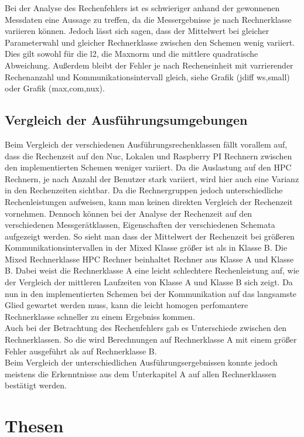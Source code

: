 Bei der Analyse des Rechenfehlers ist es schwieriger anhand der gewonnenen Messdaten eine Aussage zu treffen, da die Messergebnisse je nach Rechnerklasse variieren k\"onnen.  Jedoch l\"asst sich sagen, dass der Mittelwert bei gleicher Parameterwahl und gleicher Rechnerklasse zwischen den Schemen wenig variiert. Dies gilt sowohl f\"ur die l2, die Maxnorm und die mittlere quadratische Abweichung. Au\ss{}erdem bleibt der Fehler je nach Recheneinheit mit varrierender Rechenanzahl und Kommunikationsintervall gleich, siehe Grafik (jdiff ws,small) oder Grafik (max,com,nux).\\

\subsection{Vergleich der Ausf\"uhrungsumgebungen}
Beim Vergleich der verschiedenen Ausf\"uhrungsrechenklassen f\"allt vorallem auf, dass die Rechenzeit auf den Nuc, Lokalen und Raspberry PI Rechnern zwischen den implementierten Schemen weniger variiert. Da die Auslastung auf den HPC Rechnern, je nach Anzahl der Benutzer stark variiert, wird hier auch eine Varianz in den Rechenzeiten sichtbar. Da die Rechnergruppen jedoch unterschiedliche Rechenleistungen aufweisen, kann man keinen direkten Vergleich der Rechenzeit vornehmen. Dennoch k\"onnen bei der Analyse der Rechenzeit auf den verschiedenen Messger\"atklassen, Eigenschaften der verschiedenen Schemata aufgezeigt werden. So sieht man dass der Mittelwert der Rechenzeit bei gr\"o\ss{}eren Kommunikationsintervallen in der Mixed Klasse gr\"o\ss{}er ist als in Klasse B. Die Mixed Rechnerklasse HPC Rechner beinhaltet Rechner aus Klasse A und Klasse B. Dabei weist die Rechnerklasse A eine leicht schlechtere Rechenleistung auf, wie der Vergleich der mittleren Laufzeiten von Klasse A und Klasse B sich zeigt. Da nun in den implementierten Schemen bei der Kommunikation auf das langsamste Glied gewartet werden muss, kann die leicht homogen perfomantere Rechnerklasse schneller zu einem Ergebniss kommen.\\
Auch bei der Betrachtung des Rechenfehlers gab es Unterschiede zwischen den Rechnerklassen. So die wird Berechnungen auf Rechnerklasse A mit einem gr\"o\ss{}er Fehler ausgef\"uhrt als auf Rechnerklasse B. \\
Beim Vergleich der unterschiedlichen Ausf\"uhrungsergebnissen konnte jedoch meistens die Erkenntnisse aus dem Unterkapitel A auf allen Rechnerklassen best\"atigt werden. 

\section{Thesen}
\label{sec:thesen}

